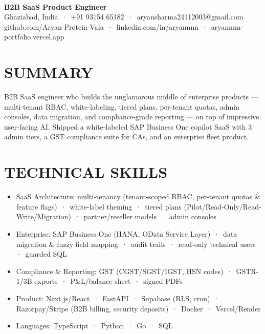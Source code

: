\documentclass[9pt]{article}
\begin{document}
\\[3pt]
{\large\bfseries B2B SaaS Product Engineer}\\[3pt]
{\small\color{greyc} Ghaziabad, India \,·\, +91 93154 65182 \,·\, aryansharma24112003@gmail.com}\vspace{-2pt}
{\small\color{greyc} github.com/Aryan-Protein-Vala \,·\, linkedin.com/in/aryannnn \,·\, aryannnn-portfolio.vercel.app}\vspace{-2pt}
\section*{SUMMARY}
B2B SaaS engineer who builds the unglamorous middle of enterprise products  ---  multi-tenant RBAC, white-labeling, tiered plans, per-tenant quotas, admin consoles, data migration, and compliance-grade reporting  ---  on top of impressive user-facing AI. Shipped a white-labeled SAP Business One copilot SaaS with 3 admin tiers, a GST compliance suite for CAs, and an enterprise fleet product.
\vspace{1pt}
\section*{TECHNICAL SKILLS}
\begin{itemize}[leftmargin=11pt,itemsep=0pt,topsep=1pt,parsep=0pt]
\item SaaS Architecture: multi-tenancy (tenant-scoped RBAC, per-tenant quotas \& feature flags) \,·\, white-label theming \,·\, tiered plans (Pilot/Read-Only/Read-Write/Migration) \,·\, partner/reseller models \,·\, admin consoles
\item Enterprise: SAP Business One (HANA, OData Service Layer) \,·\, data migration \& fuzzy field mapping \,·\, audit trails \,·\, read-only technical users \,·\, guarded SQL
\item Compliance \& Reporting: GST (CGST/SGST/IGST, HSN codes) \,·\, GSTR-1/3B exports \,·\, P\&L/balance sheet \,·\, signed PDFs
\item Product: Next.js/React \,·\, FastAPI \,·\, Supabase (RLS, cron) \,·\, Razorpay/Stripe (B2B billing, security deposits) \,·\, Docker \,·\, Vercel/Render
\item Languages: TypeScript \,·\, Python \,·\, Go \,·\, SQL
\end{itemize}
\end{document}
